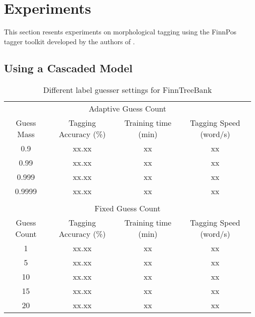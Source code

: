 \chapter{Experiments}

This section resents experiments on morphological tagging using the
FinnPos tagger toolkit developed by the authors of
\cite{Silfverberg2015}.

\section{Using a Cascaded Model}

\begin{table}[htb!]
\begin{center}
\begin{tabular}{cccc}
\multicolumn{4}{c}{Adaptive Guess Count}\\
Guess Mass & Tagging Accuracy (\%) & Training time (min) & Tagging Speed (word/s)\\
\hline
0.9        & xx.xx            & xx            & xx            \\
0.99       & xx.xx            & xx            & xx            \\
0.999      & xx.xx            & xx            & xx            \\
0.9999     & xx.xx            & xx            & xx            \\
\hline
           &                  &               &               \\
\multicolumn{4}{c}{Fixed Guess Count}\\
Guess Count & Tagging Accuracy (\%) & Training time (min) & Tagging Speed (word/s) \\
\hline
1        & xx.xx            & xx            & xx            \\
5        & xx.xx            & xx            & xx            \\
10       & xx.xx            & xx            & xx            \\
15       & xx.xx            & xx            & xx            \\
20       & xx.xx            & xx            & xx            \\
\end{tabular}
\caption{Different label guesser settings for FinnTreeBank}
\end{center}
\end{table}


